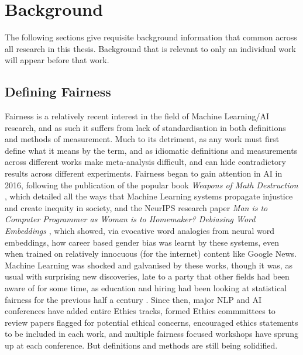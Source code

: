 \chapter{Background}\label{chapter:background}

The following sections give requisite background information that common across all research in this thesis. Background that is relevant to only an individual work will appear before that work.

\section{Defining Fairness}
Fairness is a relatively recent interest in the field of Machine Learning/AI research, and as such it suffers from lack of standardisation in both definitions and methods of measurement. Much to its detriment, as any work must first define what it means by the term, and as idiomatic definitions and measurements across different works make meta-analysis difficult, and can hide contradictory results across different experiments. Fairness began to gain attention in AI in 2016, following the publication of the popular book \textit{Weapons of Math Destruction} \citep{cathy_oneil_book}, which detailed all the ways that Machine Learning systems propagate injustice and create inequity in society, and the NeurIPS research paper \textit{Man is to Computer Programmer as Woman is to Homemaker? Debiasing Word Embeddings} \citep{Bolukbasi2016}, which showed, via evocative word analogies from neural word embeddings, how career based gender bias was learnt by these systems, even when trained on relatively innocuous (for the internet) content like Google News. Machine Learning was shocked and galvanised by these works, though it was, as usual with surprising new discoveries, late to a party that other fields had been aware of for some time, as education and hiring had been looking at statistical fairness for the previous half a century \citep{hutchinson_mitchell_2019}. Since then, major NLP and AI conferences have added entire Ethics tracks, formed Ethics commmittees to review papers flagged for potential ethical concerns, encouraged ethics statements to be included in each work, and multiple fairness focused workshops have sprung up at each conference. But definitions and methods are still being solidified.

